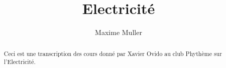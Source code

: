 \documentclass[a4paper]{report}
\author{Maxime Muller}
\title{Electricité}
\begin{document}
\maketitle

\begin{abstract}
    Ceci est une transcription des cours donné par Xavier Ovido au club Phythème sur l'Electricité.
\end{abstract}

\newpage

\tableofcontents

\end{document}
